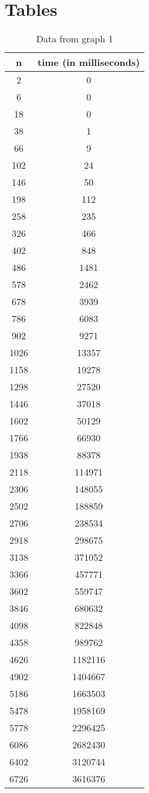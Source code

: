 \chapter{Tables}
\begin{table}[H]
\centering
\begin{tabular}{ |c|c| } 
 \hline
	n & time (in milliseconds) \\
	\hline
	2 & 0 \\
	\hline
	6 & 0 \\
	\hline
	18 & 0 \\
	\hline
	38 & 1 \\
	\hline
	66 & 9 \\
	\hline
	102 & 24 \\
	\hline
	146 & 50 \\
	\hline
	198 & 112 \\
	\hline
	258 & 235 \\
	\hline
	326 & 466 \\
	\hline
	402 & 848 \\
	\hline
	486 & 1481 \\
	\hline
	578 & 2462 \\
	\hline
	678 & 3939 \\
	\hline
	786 & 6083 \\
	\hline
	902 & 9271 \\
	\hline
	1026 & 13357 \\
	\hline
	1158 & 19278 \\
	\hline
	1298 & 27520 \\
	\hline
	1446 & 37018 \\
	\hline
	1602 & 50129 \\
	\hline
	1766 & 66930 \\
	\hline
	1938 & 88378 \\
	\hline
	2118 & 114971 \\
	\hline
	2306 & 148055 \\
	\hline
	2502 & 188859 \\
	\hline
	2706 & 238534 \\
	\hline
	2918 & 298675 \\
	\hline
	3138 & 371052 \\
	\hline
	3366 & 457771 \\
	\hline
	3602 & 559747 \\
	\hline
	3846 & 680632 \\
	\hline
	4098 & 822848 \\
	\hline
	4358 & 989762 \\
	\hline
	4626 & 1182116 \\
	\hline
	4902 & 1404667 \\
	\hline
	5186 & 1663503 \\
	\hline
	5478 & 1958169 \\
	\hline
	5778 & 2296425 \\
	\hline
	6086 & 2682430 \\
	\hline
	6402 & 3120744 \\
	\hline
	6726 & 3616376 \\
	\hline
\end{tabular}
\caption{Data from graph 1}
\end{table}

